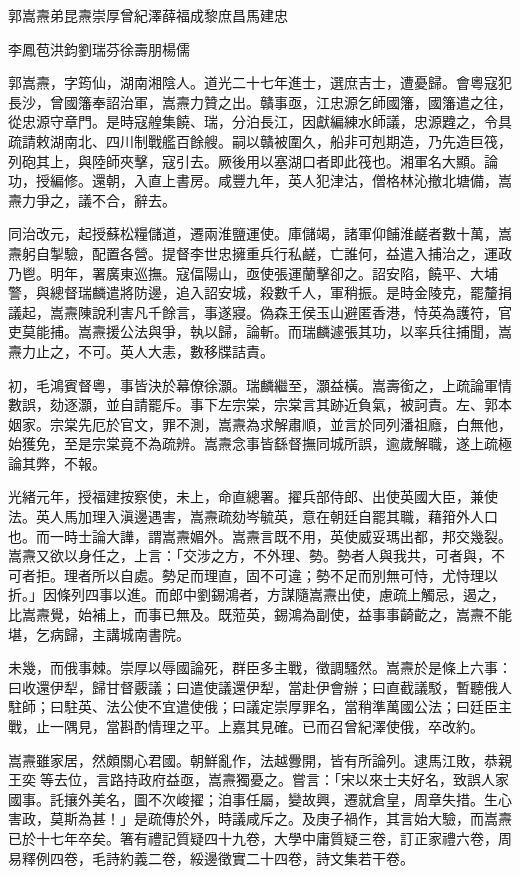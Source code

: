 
\begin{pinyinscope}
郭嵩燾弟昆燾崇厚曾紀澤薛福成黎庶昌馬建忠

李鳳苞洪鈞劉瑞芬徐壽朋楊儒

郭嵩燾，字筠仙，湖南湘陰人。道光二十七年進士，選庶吉士，遭憂歸。會粵寇犯長沙，曾國籓奉詔治軍，嵩燾力贊之出。贛事亟，江忠源乞師國籓，國籓遣之往，從忠源守章門。是時寇艎集饒、瑞，分泊長江，因獻編練水師議，忠源韙之，令具疏請敕湖南北、四川制戰艦百餘艘。嗣以贛被圍久，船非可剋期造，乃先造巨筏，列砲其上，與陸師夾擊，寇引去。厥後用以塞湖口者即此筏也。湘軍名大顯。論功，授編修。還朝，入直上書房。咸豐九年，英人犯津沽，僧格林沁撤北塘備，嵩燾力爭之，議不合，辭去。

同治改元，起授蘇松糧儲道，遷兩淮鹽運使。庫儲竭，諸軍仰餔淮鹺者數十萬，嵩燾躬自掣驗，配置各營。提督李世忠擁重兵行私鹺，亡誰何，益遣入捕治之，運政乃鬯。明年，署廣東巡撫。寇偪陽山，亟使張運蘭擊卻之。詔安陷，饒平、大埔警，與總督瑞麟遣將防邊，追入詔安城，殺數千人，軍稍振。是時金陵克，罷釐捐議起，嵩燾陳說利害凡千餘言，事遂寢。偽森王侯玉山避匿香港，恃英為護符，官吏莫能捕。嵩燾援公法與爭，執以歸，論斬。而瑞麟遽張其功，以率兵往捕聞，嵩燾力止之，不可。英人大恚，數移牒詰責。

初，毛鴻賓督粵，事皆決於幕僚徐灝。瑞麟繼至，灝益橫。嵩壽銜之，上疏論軍情數誤，劾逐灝，並自請罷斥。事下左宗棠，宗棠言其跡近負氣，被訶責。左、郭本姻家。宗棠先厄於官文，罪不測，嵩燾為求解肅順，並言於同列潘祖廕，白無他，始獲免，至是宗棠竟不為疏辨。嵩燾念事皆繇督撫同城所誤，逾歲解職，遂上疏極論其弊，不報。

光緒元年，授福建按察使，未上，命直總署。擢兵部侍郎、出使英國大臣，兼使法。英人馬加理入滇邊遇害，嵩燾疏劾岑毓英，意在朝廷自罷其職，藉箝外人口也。而一時士論大譁，謂嵩燾媚外。嵩燾言既不用，英使威妥瑪出都，邦交幾裂。嵩燾又欲以身任之，上言：「交涉之方，不外理、勢。勢者人與我共，可者與，不可者拒。理者所以自處。勢足而理直，固不可違；勢不足而別無可恃，尤恃理以折。」因條列四事以進。而郎中劉錫鴻者，方謀隨嵩燾出使，慮疏上觸忌，遏之，比嵩燾覺，始補上，而事已無及。既蒞英，錫鴻為副使，益事事齮齕之，嵩燾不能堪，乞病歸，主講城南書院。

未幾，而俄事棘。崇厚以辱國論死，群臣多主戰，徵調騷然。嵩燾於是條上六事：曰收還伊犁，歸甘督覈議；曰遣使議還伊犁，當赴伊會辦；曰直截議駁，暫聽俄人駐師；曰駐英、法公使不宜遣使俄；曰議定崇厚罪名，當稍準萬國公法；曰廷臣主戰，止一隅見，當斟酌情理之平。上嘉其見確。已而召曾紀澤使俄，卒改約。

嵩燾雖家居，然頗關心君國。朝鮮亂作，法越釁開，皆有所論列。逮馬江敗，恭親王奕等去位，言路持政府益亟，嵩燾獨憂之。嘗言：「宋以來士夫好名，致誤人家國事。託攘外美名，圖不次峻擢；洎事任屬，變故興，遷就倉皇，周章失措。生心害政，莫斯為甚！」是疏傳於外，時議咸斥之。及庚子禍作，其言始大驗，而嵩燾已於十七年卒矣。箸有禮記質疑四十九卷，大學中庸質疑三卷，訂正家禮六卷，周易釋例四卷，毛詩約義二卷，綏邊徵實二十四卷，詩文集若干卷。


\end{pinyinscope}
